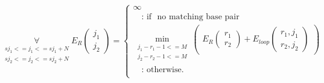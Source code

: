 \begin{equation*}
\underset{\substack{sj_{1} <= j_{1} <= sj_{1}+N\\sj_{2} <= j_{2} <= sj_{2}+N}}{\forall}
E_R(\substack{j_1\\j_2}) = \begin{cases}
\infty\\
\quad\text{: if } \text{ no matching base pair }\\
\min\limits_{\substack{j_{1}-r_{1}-1 <= M\\j_{2}-r_{2}-1 <= M}}
\begin{pmatrix}
E_R(\substack{r_1\\r_2}) + E_{loop}(\substack{r_1,j_1\\r_2,j_2})
\end{pmatrix}\\
\quad\text{: otherwise.}\\

\end{cases}
\end{equation*}

